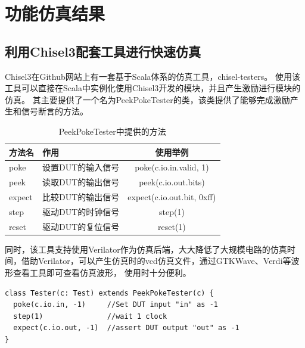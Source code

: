 \chapter{功能仿真结果}

\section{利用Chisel3配套工具进行快速仿真}
Chisel3在Github网站上有一套基于Scala体系的仿真工具，chisel-testers。
使用该工具可以直接在Scala中实例化使用Chisel3开发的模块，并且产生激励进行模块的仿真。
其主要提供了一个名为PeekPokeTester的类，该类提供了能够完成激励产生和信号断言的方法。
\begin{table}[h] %
    \centering
    \caption{PeekPokeTester中提供的方法} %
    \begin{tabular}{l|l|c} %
    \hline  
    \hline  
    方法名 & 作用 & 使用举例 \\ %
    \hline %
    poke & 设置DUT的输入信号 & poke(c.io.in.valid, 1) \\
    \hline  
    peek & 读取DUT的输出信号 & peek(c.io.out.bits) \\
    \hline  
    expect & 比较DUT的输出信号 & expect(c.io.out.bit, 0xff) \\
    \hline  
    step & 驱动DUT的时钟信号 & step(1) \\
    \hline
    reset & 驱动DUT的复位信号 & reset(1) \\
    \hline  
    \hline  
    \end{tabular}  
\end{table}
同时，该工具支持使用Verilator作为仿真后端，大大降低了大规模电路的仿真时间，借助Verilator，可以产生仿真时的vcd仿真文件，通过GTKWave、Verdi等波形查看工具即可查看仿真波形，
使用时十分便利。
            \begin{lstlisting}[title=Chisel Test Example, frame=shadowbox]
class Tester(c: Test) extends PeekPokeTester(c) {
  poke(c.io.in, -1)     //Set DUT input "in" as -1
  step(1)               //wait 1 clock
  expect(c.io.out, -1)  //assert DUT output "out" as -1
}
            \end{lstlisting}

